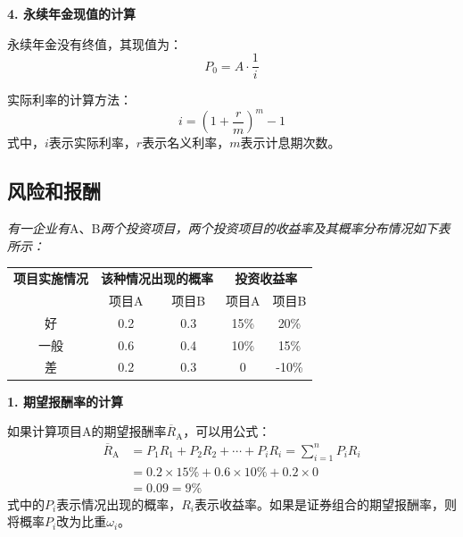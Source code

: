 \documentclass[
  10pt,
  twoside,
  openany,
  b5paper, %
  colorscheme = black, %
  xits = false,
]{qyxf-book}
\begin{document}
\textbf{4. 永续年金现值的计算}

永续年金没有终值，其现值为：
\begin{equation*}
	P_0 = A \cdot \frac{1}{i}
\end{equation*}

\begin{note}
	实际利率的计算方法：
	\begin{equation*}
		i = \left(1+\frac{r}{m}\right)^m-1
	\end{equation*}
式中，$i$表示实际利率，$r$表示名义利率，$m$表示计息期次数。
\end{note}

\newpage

\subsection{风险和报酬}

\emph{
有一企业有}A、B\emph{两个投资项目，两个投资项目的收益率及其概率分布情况如下表所示：}

\begin{table}[htbp]
	\centering
	\begin{tabular}{ccccc}
		\toprule
		\textbf{项目实施情况} & \multicolumn{2}{c}{\textbf{该种情况出现的概率}} & \multicolumn{2}{c}{\textbf{投资收益率}} \\
		\cmidrule{2-5}
		& 项目A & 项目B & 项目A & 项目B \\
		\midrule
		好 & 0.2 & 0.3 & 15\% & 20\% \\
		一般 & 0.6 & 0.4 & 10\% & 15\% \\
		差 & 0.2 & 0.3 & 0 & -10\% \\
		\bottomrule
	\end{tabular}
\end{table}

\textbf{1. 期望报酬率的计算}

如果计算项目A的期望报酬率$\overline{R}_\mathrm{A}$，可以用公式：
\begin{equation*}
	\begin{aligned}
		\overline{R}_\mathrm{A} & = P_1R_1 + P_2R_2 + \cdots + P_iR_i = \sum_{i=1}^{n} P_iR_i \\
					 & = 0.2 \times 15\% + 0.6 \times 10\% + 0.2 \times 0 \\
					 & = 0.09 =9\%
	\end{aligned}
\end{equation*}
式中的$P_i$表示情况出现的概率，$R_i$表示收益率。如果是证券组合的期望报酬率，则将概率$P_i$改为比重$\omega_i$。
\end{document}
